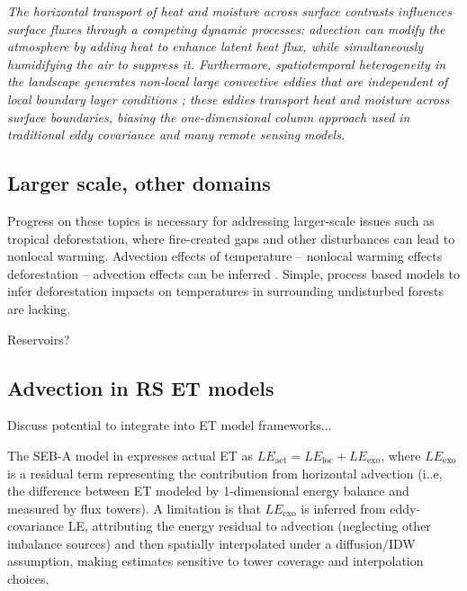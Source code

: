 \documentclass{article}
\begin{document}
    \textit{The horizontal transport of heat and moisture across surface contrasts influences surface fluxes through a competing dynamic processes: advection can modify the atmosphere by adding heat to enhance latent heat flux, while simultaneously humidifying the air to suppress it. Furthermore, spatiotemporal heterogeneity in the landscape generates non-local large convective eddies that are independent of local boundary layer conditions \cite{wang2024advection}; these eddies transport heat and moisture across surface boundaries,  biasing the one-dimensional column approach used in traditional eddy covariance and many remote sensing models.}
    
    \subsection{Larger scale, other domains}
    
    Progress on these topics is necessary for addressing larger-scale issues such as tropical deforestation, where fire-created gaps and other disturbances can lead to nonlocal warming.
    Advection effects of temperature -- nonlocal warming effects deforestation -- advection effects can be inferred \cite{cohn2019forest, crompton2021deforestation}. 
    Simple, process based models to infer deforestation impacts on temperatures in surrounding undisturbed forests are lacking.
    
    Reservoirs?
    
    \subsection{Advection in  RS ET models}
    
    Discuss potential to integrate into ET model frameworks... 
    
    The SEB-A model in \citet{liu2016regional} expresses actual ET as $LE_{\mathrm{act}} = LE_{\mathrm{loc}} + LE_{\mathrm{exo}}$, where $LE_{\mathrm{exo}}$ is a  residual term representing the contribution from horizontal advection (i..e, the difference between ET modeled by 1-dimensional energy balance and measured by flux towers). 
    A  limitation is that $LE_{\mathrm{exo}}$ is inferred from eddy-covariance LE, attributing the energy residual to advection (neglecting other imbalance sources) and then spatially interpolated under a diffusion/IDW assumption, making estimates sensitive to tower coverage and interpolation choices.
    
\end{document}
